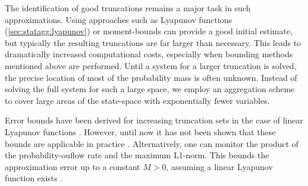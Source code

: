 The identification of good truncations remains a major task in such
approximations.
Using approaches such as Lyapunov functions
(\autoref{sec:statagg:lyapunov}) \parencite{dayar2011bounding} or
moment-bounds \parencite{kuntz2021approximations} can provide a good
initial estimate, but typically the resulting truncations are far
larger than necessary.
This leads to dramatically increased computational costs, especially
when bounding methods mentioned above are performed.
Until a system for a larger truncation is solved, the precise
location of  most of the probability mass is often unknown.
Instead of solving the full system for such a large space, we employ
an aggregation scheme to cover large areas of the state-space with
exponentially fewer variables.

Error bounds have been derived for increasing  truncation sets
in the case of linear Lyapunov functions  \parencite{gupta2017finite}.
However, until now it has not been shown that these bounds are
applicable in practice \parencite{meyn1994computable}.
Alternatively, one can monitor the product of the probability-ouflow
rate and the maximum L1-norm.
This bounds the approximation error up to a constant $M>0$, assuming
a linear Lyapunov function exists \parencite{gupta2017finite}.

